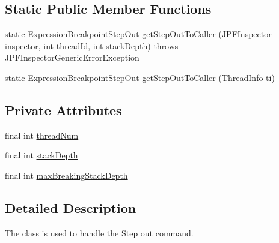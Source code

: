 \subsection*{Static Public Member Functions}
\begin{DoxyCompactItemize}
\item 
static \hyperlink{classgov_1_1nasa_1_1jpf_1_1inspector_1_1server_1_1expression_1_1expressions_1_1_expression_breakpoint_step_out}{Expression\+Breakpoint\+Step\+Out} \hyperlink{classgov_1_1nasa_1_1jpf_1_1inspector_1_1server_1_1expression_1_1expressions_1_1_expression_breakpoint_step_out_ab3e6e5555b0c191e8eb3c778d7e4a19a}{get\+Step\+Out\+To\+Caller} (\hyperlink{classgov_1_1nasa_1_1jpf_1_1inspector_1_1server_1_1jpf_1_1_j_p_f_inspector}{J\+P\+F\+Inspector} inspector, int thread\+Id, int \hyperlink{classgov_1_1nasa_1_1jpf_1_1inspector_1_1server_1_1expression_1_1expressions_1_1_expression_breakpoint_step_out_a1bee35b7dd22e687b0e2f3a0c2a3402d}{stack\+Depth})  throws J\+P\+F\+Inspector\+Generic\+Error\+Exception 
\item 
static \hyperlink{classgov_1_1nasa_1_1jpf_1_1inspector_1_1server_1_1expression_1_1expressions_1_1_expression_breakpoint_step_out}{Expression\+Breakpoint\+Step\+Out} \hyperlink{classgov_1_1nasa_1_1jpf_1_1inspector_1_1server_1_1expression_1_1expressions_1_1_expression_breakpoint_step_out_aa44c16dde050ed4bbed55e13b1f37ad2}{get\+Step\+Out\+To\+Caller} (Thread\+Info ti)
\end{DoxyCompactItemize}
\subsection*{Private Attributes}
\begin{DoxyCompactItemize}
\item 
final int \hyperlink{classgov_1_1nasa_1_1jpf_1_1inspector_1_1server_1_1expression_1_1expressions_1_1_expression_breakpoint_step_out_a26bade410d323cf7876faa4dc9ef28c4}{thread\+Num}
\item 
final int \hyperlink{classgov_1_1nasa_1_1jpf_1_1inspector_1_1server_1_1expression_1_1expressions_1_1_expression_breakpoint_step_out_a1bee35b7dd22e687b0e2f3a0c2a3402d}{stack\+Depth}
\item 
final int \hyperlink{classgov_1_1nasa_1_1jpf_1_1inspector_1_1server_1_1expression_1_1expressions_1_1_expression_breakpoint_step_out_a14730a9260589b7a29fe2bc6daf750ad}{max\+Breaking\+Stack\+Depth}
\end{DoxyCompactItemize}


\subsection{Detailed Description}
The class is used to handle the Step out command. 

